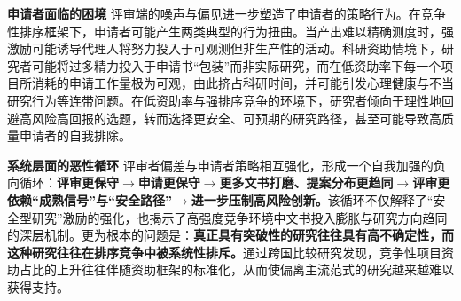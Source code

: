 
\textbf{申请者面临的困境} \quad 评审端的噪声与偏见进一步塑造了申请者的策略行为。在竞争性排序框架下，申请者可能产生两类典型的行为扭曲。当产出难以精确测度时，强激励可能诱导代理人将努力投入于可观测但非生产性的活动\citep{holmstromMoralHazardObservability1979}。科研资助情境下，研究者可能将过多精力投入于申请书“包装”而非实际研究，而在低资助率下每一个项目所消耗的申请工作量极为可观\citep{schweigerCostsCompetitionDistributing2024}，由此挤占科研时间，并可能引发心理健康与不当研究行为等连带问题。在低资助率与强排序竞争的环境下，研究者倾向于理性地回避高风险高回报的选题，转而选择更安全、可预期的研究路径，甚至可能导致高质量申请者的自我排除\citep{wangFundingModelCreativity2018, grossContestModelsHighlight2019, addaGrantmakingGradingCurve2024}。

\textbf{系统层面的恶性循环} \quad 评审者偏差与申请者策略相互强化，形成一个自我加强的负向循环：\textbf{评审更保守$\to$申请更保守$\to$更多文书打磨、提案分布更趋同$\to$评审更依赖“成熟信号”与“安全路径”$\to$进一步压制高风险创新。}该循环不仅解释了“安全型研究”激励的强化，也揭示了高强度竞争环境中文书投入膨胀与研究方向趋同的深层机制。更为根本的问题是：\textbf{真正具有突破性的研究往往具有高不确定性，而这种研究往往在排序竞争中被系统性排斥。}\cite{whitleyImpactChangingFunding2018}通过跨国比较研究发现，竞争性项目资助占比的上升往往伴随资助框架的标准化，从而使偏离主流范式的研究越来越难以获得支持。


